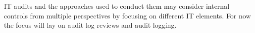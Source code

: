 IT audits and the approaches used to conduct them may consider internal controls from multiple perspectives by focusing on different IT elements. For now the focus will lay on audit log reviews and audit logging.








